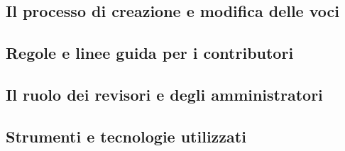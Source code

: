 \documentclass[12pt,a4paper]{report}
\begin{document}
\subsection{Il processo di creazione e modifica delle voci}
\subsection{Regole e linee guida per i contributori}
\subsection{Il ruolo dei revisori e degli amministratori}
\subsection{Strumenti e tecnologie utilizzati}

\newpage

\printbibliography
\end{document}
